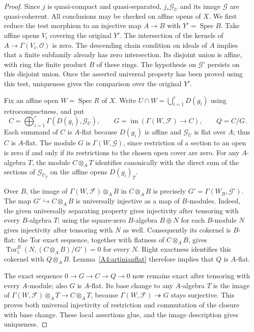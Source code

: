 \begin{proof}
Since $j$ is quasi-compact and quasi-separated, $j_*\mathcal G_U$ and its
image $\mathcal G$ are quasi-coherent.  All conclusions may be checked on
affine opens of $X$.  We first reduce the test morphism to an injective map
$A\to B$ with $Y'=\operatorname{Spec}B$.
Take affine opens $V_i$ covering the original $Y'$.  The intersection of
the kernels of $A\to\Gamma(V_i,\mathcal O)$ is zero.  The descending chain
condition on ideals of $A$ implies that a finite subfamily already has
zero intersection.  Its disjoint union is affine, with ring the finite
product $B$ of these rings.  The hypothesis on $\mathcal G'$ persists on
this disjoint union.  Once the asserted universal property has been proved
using this test, uniqueness gives the comparison over the original $Y'$.

Fix an affine open $W=\operatorname{Spec}R$ of $X$.  Write
$U\cap W=\bigcup_{i=1}^r D(g_i)$ using retrocompactness, and put
\[
 C=\bigoplus_{i=1}^r\Gamma(D(g_i),\mathcal G_U),\qquad
 G=\operatorname{im}(\Gamma(W,\mathcal F)\longrightarrow C),\qquad Q=C/G.
\]
Each summand of $C$ is $A$-flat because $D(g_i)$ is affine and
$\mathcal G_U$ is flat over $A$; thus $C$ is $A$-flat.  The module $G$ is
$\Gamma(W,\mathcal G)$, since restriction of a section to an open is zero
if and only if its restrictions to the chosen open cover are zero.
For any $A$-algebra $T$, the module $C\otimes_A T$ identifies canonically
with the direct sum of the sections of $\mathcal G_{U_T}$ on the affine
opens $D(g_i)_T$.

Over $B$, the image of $\Gamma(W,\mathcal F)\otimes_A B$ in $C\otimes_A B$
is precisely $G'=\Gamma(W_B,\mathcal G')$.  The map
$G'\hookrightarrow C\otimes_A B$ is universally injective as a map of
$B$-modules.  Indeed, the given universally separating property gives
injectivity after tensoring with every $B$-algebra $T$; using the square-zero
$B$-algebra $B\oplus N$ for each $B$-module $N$ gives injectivity after
tensoring with $N$ as well.  Consequently its cokernel is $B$-flat:
the Tor exact sequence, together with flatness of $C\otimes_A B$, gives
$\operatorname{Tor}_1^B(N,(C\otimes_A B)/G')=0$ for every $N$.
Right exactness identifies this cokernel with $Q\otimes_A B$.
Lemma~\ref{A4:artinianflat} therefore implies that $Q$ is $A$-flat.

The exact sequence $0\to G\to C\to Q\to0$ now remains exact after tensoring
with every $A$-module; also $G$ is $A$-flat.  Its base change to any
$A$-algebra $T$ is the image of
$\Gamma(W,\mathcal F)\otimes_A T\to C\otimes_A T$, because
$\Gamma(W,\mathcal F)\twoheadrightarrow G$ stays surjective.
This proves both universal injectivity of restriction and commutation of
the closure with base change.  These local assertions glue, and the image
description gives uniqueness.


\end{proof}

